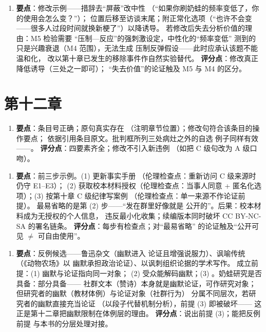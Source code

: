 \begin{enumerate}[label=\textbf{3.},leftmargin=2.6em]
  \item \textbf{要点}：修改示例——措辞去“屏蔽”改中性
        （“如果你刷奶蛙的频率变低了，你的使用会怎么变？”）；
        位置后移至访谈末尾；附正常化选项（“也许不会变
        ——很多人过段时间就换新梗了”）以降诱导。
        若修改后失去分析价值的理由：M5 检验需要
        “压制—反应”的强刺激设定，中性化的“频率变低”
        测到的只是兴趣衰退（M4 范围），无法生成
        压制反弹假设——此时应承认该题不能温和化，
        改以第十章已发生的移除事件作自然实验替代。
        \textbf{评分点}：修改真正降低诱导（三处之一即可）；
        “失去价值”的论证触及 M5 与 M4 的区分。
\end{enumerate}

\section{第十二章}\label{app:ans:12}

\begin{enumerate}[label=\textbf{1.},leftmargin=2.6em]
  \item \textbf{要点}：条目号正确；原句真实存在
        （注明章节位置）；修改句符合该条目的操作要点；
        依据引用条目原文。批判框所列三处病灶之外的自选
        例子同样有效——。
        \textbf{评分点}：四要素齐全；修改不引入新违例
        （如把 C 级句改为 A 级口吻）。
\end{enumerate}

\begin{enumerate}[label=\textbf{2.},leftmargin=2.6em]
  \item \textbf{要点}：前三步示例。(1) 更新事实手册
        （伦理检查点：重新访问 C 级来源时仍守 E1--E3）；
        (2) 获取校本材料授权（伦理检查点：当事人同意 +
        匿名化选项）；(3) 按第十章 C 级纪律写案例
        （伦理检查点：单一来源不作论证前提）。
        最易省略的是第 (2) 步——“发在群里好像就是
        公开的”。后果：校本材料成为无授权的个人信息，
        违反最小化收集；续编版本同时破坏 CC BY-NC-SA
        的署名链条。
        \textbf{评分点}：每步有检查点；对“最易省略”
        的论证触及“公开可见 $\ne$ 可自由使用”。
\end{enumerate}

\begin{enumerate}[label=\textbf{3.},leftmargin=2.6em]
  \item \textbf{要点}：反例候选——鲁迅杂文（幽默进入
        论证且增强说服力）、讽喻传统（《动物农场》以
        幽默承担政治论证）、以讽刺组织论据的学术写作。
        成立前提：(1) 幽默与论证指向同一对象；
        (2) 受众能解码幽默；(3) 。奶蛙研究是否具备：部分具备——
        社群文本（赞诗）本身就是幽默论证，可作研究对象；
        但研究者的幽默（教材体例）与论证对象（社群行为）
        分属不同层次，若研究者的幽默直接充当论证
        （以段子代替机制分析），前提 (3) 即被破坏——
        这正是第十二章把幽默限制在体例层的理由。
        \textbf{评分点}：说出前提 (3)；能把反例前提
        与本书的分层处理对接。
\end{enumerate}
